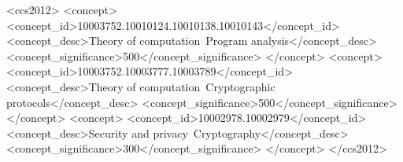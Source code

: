 \documentclass[sigconf, screen, natbib=false, dvipsnames, table]{acmart}
\theoremstyle{definition}
\begin{document}
\renewcommand{\A}{{\sf A}}
\renewcommand{\B}{{\sf B}}
\renewcommand{\C}{{\sf C}}
\renewcommand{\D}{{\sf D}}


\begin{abstract}


\end{abstract}


%
%
\begin{CCSXML}
<ccs2012>
<concept>
<concept_id>10003752.10010124.10010138.10010143</concept_id>
<concept_desc>Theory of computation~Program analysis</concept_desc>
<concept_significance>500</concept_significance>
</concept>
<concept>
<concept_id>10003752.10003777.10003789</concept_id>
<concept_desc>Theory of computation~Cryptographic protocols</concept_desc>
<concept_significance>500</concept_significance>
</concept>
<concept>
<concept_id>10002978.10002979</concept_id>
<concept_desc>Security and privacy~Cryptography</concept_desc>
<concept_significance>300</concept_significance>
</concept>
</ccs2012>
\end{CCSXML}


%

%
\maketitle
\end{document}
